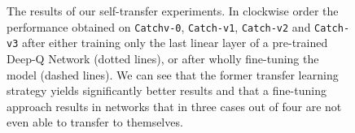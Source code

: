 \begin{figure}[ht!]
{%
}
\caption{The results of our self-transfer experiments. In clockwise order the performance obtained on \texttt{Catchv-0}, \texttt{Catch-v1}, \texttt{Catch-v2} and \texttt{Catch-v3} after either training only the last linear layer of a pre-trained Deep-Q Network (dotted lines), or after wholly fine-tuning the model (dashed lines). We can see that the former transfer learning strategy yields significantly better results and that a fine-tuning approach results in networks that in three cases out of four are not even able to transfer to themselves.}
\label{fig:hybrid_self_transfer}
\end{figure}
